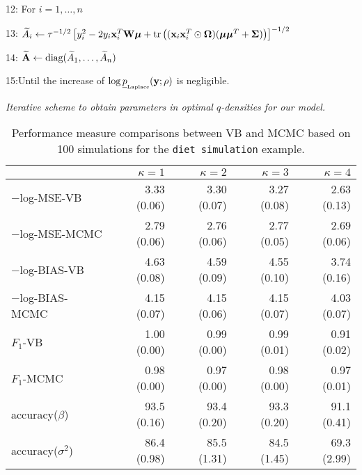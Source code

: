\documentclass[11pt]{article}
\newtheorem{Main Result}{Main Result}
\def\vectorfontone{\bf}
\def\vectorfonttwo{\boldsymbol}
\def\vx{{\vectorfontone x}}                      %
\def\vy{{\vectorfontone y}}                      %
\def\vmu{{\vectorfonttwo \mu}}                   %
\def\matrixfontone{\bf}
\def\matrixfonttwo{\boldsymbol}
\def\mA{{\matrixfontone A}}                      %
\def\mW{{\matrixfontone W}}                      %
\def\mSigma{{\matrixfonttwo \Sigma}}             %
\def\mOmega{{\matrixfonttwo \Omega}}             %
\def\tr{\text{tr}}
\begin{document}
\begin{algorithm}
\begin{minipage}[h]{\textwidth}
		\vspace{1mm}
		12:\hspace{8mm} For $i=1,\ldots,n$
		
		\vspace{1mm}
		13:\hspace{16mm} $\widetilde{A}_i \leftarrow
		\tau^{-1/2}\left[y_i^2-2y_i\vx^T_i\mW\vmu+\tr\left( (\vx_i\vx_i^T\odot\mOmega)(\vmu\vmu^{T} + \mSigma) \right)\right]^{-1/2}  $
		
		\vspace{1mm}
		14:\hspace{8mm} $\widetilde{\mA} \leftarrow \mbox{diag}(\widetilde{A}_1,\ldots,\widetilde{A}_n)$
		
		
		15:\hspace{1mm}Until the increase of $\log \underline{p}_{\mbox{\tiny Laplace}}(\vy;\rho)$ is negligible.
	\end{minipage}
	\caption{\it Iterative scheme to obtain parameters in optimal
		$q$-densities for our model.}
	\label{alg:VBourmodel}
\end{algorithm}







\begin{table}[h]
	\centering
	\begin{tabular}{lrrrr}
		& $\kappa=1$ & $\kappa=2$ & $\kappa=3$ & $\kappa=4$ \\
		\hline
		$-$log-MSE-VB          & 3.33 (0.06) & 3.30 (0.07) & 3.27 (0.08) & 2.63 (0.13) \\
		$-$log-MSE-MCMC        & 2.79 (0.06) & 2.76 (0.06) & 2.77 (0.05) & 2.69 (0.06) \\
		$-$log-BIAS-VB         & 4.63 (0.08) & 4.59 (0.09) & 4.55 (0.10) & 3.74 (0.16) \\
		$-$log-BIAS-MCMC       & 4.15 (0.07) & 4.15 (0.06) & 4.15 (0.07) & 4.03 (0.07) \\
		$F_1$-VB             & 1.00 (0.00) & 0.99 (0.00) & 0.99 (0.01) & 0.91 (0.02) \\
		$F_1$-MCMC           & 0.98 (0.00) & 0.97 (0.00) & 0.98 (0.00) & 0.97 (0.01) \\
		accuracy($\beta$)    & 93.5 (0.16) & 93.4 (0.20) & 93.3 (0.20) & 91.1 (0.41) \\
		accuracy($\sigma^2$) & 86.4 (0.98) & 85.5 (1.31) & 84.5 (1.45) & 69.3 (2.99) \\  \hline
	\end{tabular}
	\caption{Performance measure comparisons between VB and MCMC
		based on 100 simulations for the {\tt diet simulation} example.}
	\label{tab:dietSimulation}
\end{table}
\end{document}

